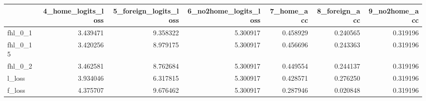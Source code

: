 \begin{tabular}{lrrrrrr}
\toprule
 & 4_home_logits_loss & 5_foreign_logits_loss & 6_no2home_logits_loss & 7_home_acc & 8_foreign_acc & 9_no2home_acc \\
\midrule
fhl_0_1 & 3.439471 & 9.358322 & 5.300917 & 0.458929 & 0.240565 & 0.319196 \\
fhl_0_15 & 3.420256 & 8.979175 & 5.300917 & 0.456696 & 0.243363 & 0.319196 \\
fhl_0_2 & 3.462581 & 8.762684 & 5.300917 & 0.449554 & 0.244137 & 0.319196 \\
l_loss & 3.934046 & 6.317815 & 5.300917 & 0.428571 & 0.276250 & 0.319196 \\
f_loss & 4.375707 & 9.676462 & 5.300917 & 0.287946 & 0.020848 & 0.319196 \\
\bottomrule
\end{tabular}
